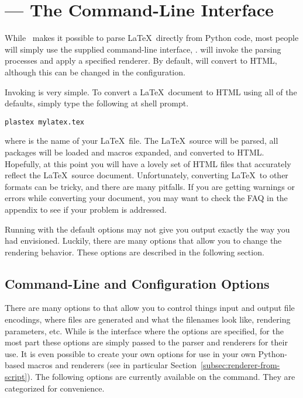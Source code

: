 
\chapter{\protect{} --- The Command-Line Interface}
\label{sec:command-line}

While \plasTeX\ makes it possible to parse \LaTeX\ directly from Python
code, most people will simply use the supplied command-line interface,
.   will invoke the parsing processes
and apply a specified renderer.  By default,  will
convert to HTML, although this can be changed in the 
configuration.

Invoking  is very simple.  To convert a \LaTeX\ document
to HTML using all of the defaults, simply type the following at shell prompt.

\begin{verbatim}
plastex mylatex.tex
\end{verbatim}

where  is the name of your \LaTeX\ file.  The
\LaTeX\ source will be parsed, all packages will be loaded and macros
expanded, and converted to HTML.  Hopefully, at this point you will have
a lovely set of HTML files that accurately reflect the \LaTeX\ source
document.  Unfortunately, converting \LaTeX\ to other formats can be
tricky, and there are many pitfalls.  If you are getting warnings or
errors while converting your document, you may want to check the FAQ
in the appendix to see if your problem is addressed.

Running  with the default options may not give you output
exactly the way you had envisioned.  Luckily, there are many options
that allow you to change the rendering behavior.  These options are
described in the following section.


\section{Command-Line and Configuration Options}

There are many options to  that allow you to control
things input and output file encodings, where files are generated and
what the filenames look like, rendering parameters, etc.  While
 is the interface where the options are specified, for
the most part these options are simply passed to the parser and renderers
for their use.  It is even possible to create your own options for use
in your own Python-based macros and renderers (see in particular
Section~\ref{subsec:renderer-from-script}).
The following options are currently available
on the  command. They are categorized for convenience.

